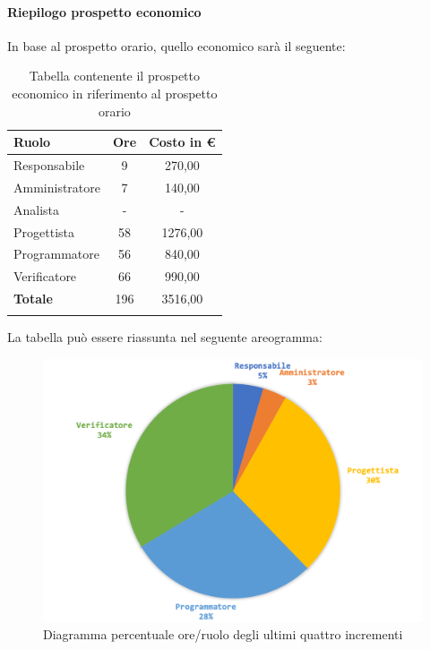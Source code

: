 	\paragraph{Riepilogo prospetto economico}
	In base al prospetto orario, quello economico sarà il seguente: 
	
	\begin{longtable}{|l|c|c|}
		\hline
		\rowcolor{lighter-grayer}
		\textbf{Ruolo} & \textbf{Ore} & \textbf{Costo in € } \\
		\hline
		\endfirsthead
		
		\hline
		Responsabile 	    & 9 & 270,00\\
		\hline 
		\hline
		Amministratore	   & 7 & 140,00\\
		\hline
		\hline
		Analista 				& - & -\\
		\hline
		\hline
		Progettista 		   & 58 & 1276,00\\
		\hline
		\hline
		Programmatore 	  & 56 & 840,00\\
		\hline
		\hline
		Verificatore 		   & 66 & 990,00\\
		\hline
		\textbf{Totale} 	 & 196 & 3516,00\\
		\hline
		\caption{Tabella contenente il prospetto economico in riferimento al prospetto orario}
	\end{longtable}
	
	La tabella può essere riassunta nel seguente areogramma:
	\begin{figure}[H]
		\centering
		\includegraphics[width=0.8\linewidth]{./images/preventivo/incremento9-12-2.png}
		\caption{Diagramma percentuale ore/ruolo degli ultimi quattro incrementi}
		\label{fig:diagramma costi ruolo incrementi IX-XII}
	\end{figure}
	\pagebreak
	

